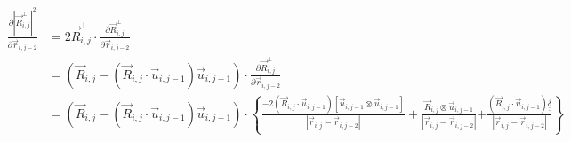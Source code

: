 \documentclass{article}
\renewcommand{\ij}{_{i,j}}
\newcommand{\ijj}{_{i,j-1}}
\newcommand{\ijjj}{_{i,j-2}}
\newcommand{\magn}[1]{\left\vert #1 \right\vert }
\renewcommand{\part}[2]{\frac{\partial #1 }{\partial #2}}
\newcommand{\ten}[1]{\underline{\underline{#1}}}
\newcommand{\rij}{\vec{r} \ij}
\newcommand{\Rij}{\vec{R} \ij}
\newcommand{\rijjj}{\vec{r} \ijjj}
\newcommand{\uijj}{\vec{u} \ijj}
\begin{document}
\begin{align*}
  \part{
    \magn{\Rij^\perp}^2
  }{ \rijjj }
  &= 
  2 \Rij^\perp \cdot \part{\Rij^\perp}{\rijjj}
  \\
  &= 
  \left(
  \vec{R} \ij 
  - 
  \left(\vec{R} \ij \cdot \vec{u} \ijj \right) 
  \vec{u} \ijj 
  \right)
  \cdot 
  \part{\Rij^\perp}{\rijjj}
  \\
  &= 
  \left(
  \vec{R} \ij 
  - 
  \left(\vec{R} \ij \cdot \vec{u} \ijj \right) 
  \vec{u} \ijj 
  \right)
  \cdot 
  \left\{
    \frac{
      -
  2
      \left(
        \Rij\cdot \uijj 
      \right)
      \left[
       \uijj 
      \otimes \uijj 
      \right]
      }{\magn{\rij - \rijjj}}
       + 
    \frac{
  \Rij 
  \otimes \uijj 
      }{\magn{\rij - \rijjj}}
  {
    +
  \frac{
  \left(
    \Rij 
    \cdot 
    \uijj 
  \right)
  \ten{\delta}
    }{\magn{\rij - \rijjj}}
  }
  \right\}
\end{align*}
\end{document}
